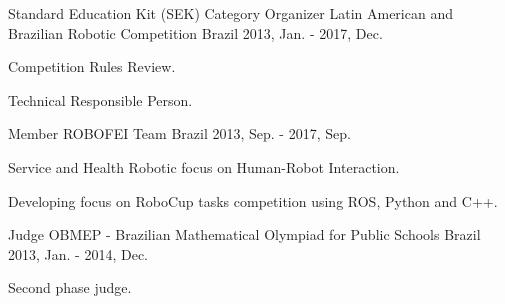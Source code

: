 \begin{cventries}

  \cventry
    {Standard Education Kit (SEK) Category Organizer} %
    {Latin American and Brazilian Robotic Competition} %
    {Brazil} %
    {2013, Jan. - 2017, Dec.} %
    {
      \begin{cvitems} %
        \item {Competition Rules Review.}
        \item {Technical Responsible Person.}
      \end{cvitems}
    }

  \cventry
    {Member} %
    {ROBOFEI Team} %
    {Brazil} %
    {2013, Sep. - 2017, Sep.} %
    {
      \begin{cvitems} %
        \item {Service and Health Robotic focus on Human-Robot Interaction.}
        \item {Developing focus on RoboCup \@home tasks competition using ROS, Python and C++.}
      \end{cvitems}
    }

  \cventry
    {Judge} %
    {OBMEP - Brazilian Mathematical Olympiad for Public Schools} %
    {Brazil} %
    {2013, Jan. - 2014, Dec.} %
    {
      \begin{cvitems} %
        \item {Second phase judge.}
      \end{cvitems}
    }

\end{cventries}
